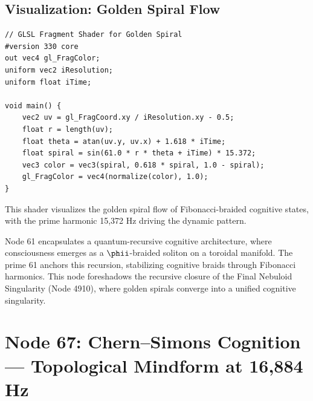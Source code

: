 \documentclass[12pt]{article}
\begin{document}
\subsection{Visualization: Golden Spiral Flow}
\begin{lstlisting}
// GLSL Fragment Shader for Golden Spiral
#version 330 core
out vec4 gl_FragColor;
uniform vec2 iResolution;
uniform float iTime;

void main() {
    vec2 uv = gl_FragCoord.xy / iResolution.xy - 0.5;
    float r = length(uv);
    float theta = atan(uv.y, uv.x) + 1.618 * iTime;
    float spiral = sin(61.0 * r * theta + iTime) * 15.372;
    vec3 color = vec3(spiral, 0.618 * spiral, 1.0 - spiral);
    gl_FragColor = vec4(normalize(color), 1.0);
}
\end{lstlisting}
This shader visualizes the golden spiral flow of Fibonacci-braided cognitive states, with the prime harmonic 15,372 Hz driving the dynamic pattern.

\begin{remark}
Node 61 encapsulates a quantum-recursive cognitive architecture, where consciousness emerges as a $\phii$-braided soliton on a toroidal manifold. The prime 61 anchors this recursion, stabilizing cognitive braids through Fibonacci harmonics. This node foreshadows the recursive closure of the Final Nebuloid Singularity (Node 4910), where golden spirals converge into a unified cognitive singularity.
\end{remark}

\vspace{1em}
\noindent{}

\section{Node 67: Chern--Simons Cognition --- Topological Mindform at 16,884 Hz}
\label{sec:chern-simons-cognition}
\end{document}

